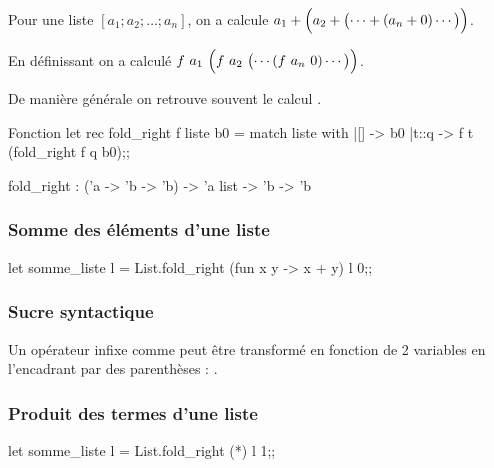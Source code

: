Pour une liste $[a_1; a_2; \ldots ; a_n]$, on a calcule
$a_1 + \Bigl(a_2 + \bigl(\cdots + (a_n + 0)\cdots\bigl)\Bigl)$.

En définissant  on a calculé
$f \ a_1\ \Bigl(f\ a_2\ \bigl(\cdots (f\ a_n\ 0)\cdots\bigl)\Bigl)$.

De manière générale on retrouve souvent le calcul
.
\begin{code}{Fonction }
let rec fold_right f liste b0 =
   match liste with
   |[] -> b0
   |t::q -> f t (fold_right f q b0);;

fold_right : ('a -> 'b -> 'b) -> 'a list -> 'b -> 'b
\end{code} 
\subsubsection{Somme des éléments d'une liste}
\begin{ocaml}
let somme_liste l = 
   List.fold_right (fun x y -> x + y) l 0;;
\end{ocaml}
\subsubsection{Sucre syntactique}
Un opérateur infixe comme  peut être transformé en fonction de 2 variables en l'encadrant par des parenthèses : .
\subsubsection{Produit des termes d'une liste}
\begin{ocaml}
let somme_liste l = 
   List.fold_right (*) l 1;;
\end{ocaml}
\newpage
